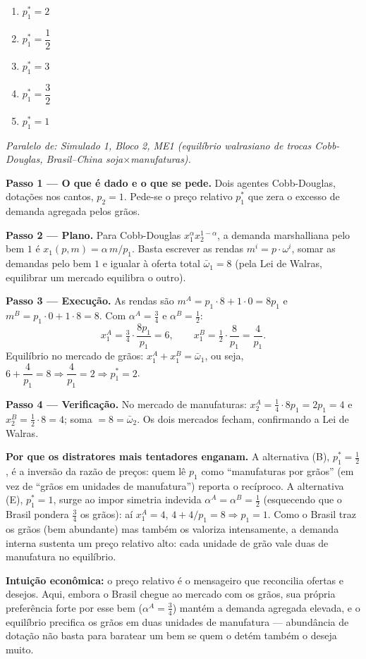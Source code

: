 \begin{enumerate}[label=\Alph*., leftmargin=3.2em, itemsep=0.15em, topsep=0.2em]
  \item $p_1^{*}=2$
  \item $p_1^{*}=\dfrac{1}{2}$
  \item $p_1^{*}=3$
  \item $p_1^{*}=\dfrac{3}{2}$
  \item $p_1^{*}=1$
\end{enumerate}
\begin{solucao}
{\footnotesize\textit{Paralelo de: Simulado 1, Bloco 2, ME1 (equilíbrio walrasiano de trocas Cobb-Douglas, Brasil–China soja$\times$manufaturas).}}\par\vspace{0.2em}
\textbf{Passo 1 --- O que é dado e o que se pede.} Dois agentes Cobb-Douglas, dotações nos cantos, $p_2=1$. Pede-se o preço relativo $p_1^{*}$ que zera o excesso de demanda agregada pelos grãos.

\textbf{Passo 2 --- Plano.} Para Cobb-Douglas $x_1^{\alpha}x_2^{1-\alpha}$, a demanda marshalliana pelo bem $1$ é $x_1(p,m)=\alpha\,m/p_1$. Basta escrever as rendas $m^i=p\cdot\omega^i$, somar as demandas pelo bem $1$ e igualar à oferta total $\bar\omega_1=8$ (pela Lei de Walras, equilibrar um mercado equilibra o outro).

\textbf{Passo 3 --- Execução.} As rendas são $m^A=p_1\cdot 8+1\cdot 0=8p_1$ e $m^B=p_1\cdot 0+1\cdot 8=8$. Com $\alpha^A=\tfrac34$ e $\alpha^B=\tfrac12$:
\[ x_1^A=\tfrac34\cdot\frac{8p_1}{p_1}=6, \qquad x_1^B=\tfrac12\cdot\frac{8}{p_1}=\frac{4}{p_1}. \]
Equilíbrio no mercado de grãos: $x_1^A+x_1^B=\bar\omega_1$, ou seja, $6+\dfrac{4}{p_1}=8\Rightarrow\dfrac{4}{p_1}=2\Rightarrow p_1^{*}=2$.

\textbf{Passo 4 --- Verificação.} No mercado de manufaturas: $x_2^A=\tfrac14\cdot 8p_1=2p_1=4$ e $x_2^B=\tfrac12\cdot 8=4$; soma $=8=\bar\omega_2$. Os dois mercados fecham, confirmando a Lei de Walras.

\textbf{Por que os distratores mais tentadores enganam.} A alternativa (B), $p_1^{*}=\tfrac12$, é a inversão da razão de preços: quem lê $p_1$ como ``manufaturas por grãos'' (em vez de ``grãos em unidades de manufatura'') reporta o recíproco. A alternativa (E), $p_1^{*}=1$, surge ao impor simetria indevida $\alpha^A=\alpha^B=\tfrac12$ (esquecendo que o Brasil pondera $\tfrac34$ os grãos): aí $x_1^A=4$, $4+4/p_1=8\Rightarrow p_1=1$. Como o Brasil traz os grãos (bem abundante) mas também os valoriza intensamente, a demanda interna sustenta um preço relativo alto: cada unidade de grão vale duas de manufatura no equilíbrio.

\textbf{Intuição econômica:} o preço relativo é o mensageiro que reconcilia ofertas e desejos. Aqui, embora o Brasil chegue ao mercado com os grãos, sua própria preferência forte por esse bem ($\alpha^A=\tfrac34$) mantém a demanda agregada elevada, e o equilíbrio precifica os grãos em duas unidades de manufatura --- abundância de dotação não basta para baratear um bem se quem o detém também o deseja muito.
\end{solucao}

